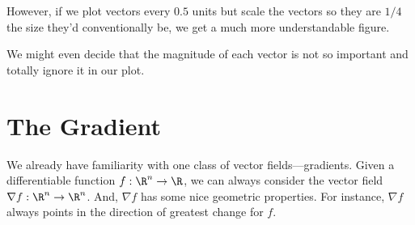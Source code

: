 However, if we plot vectors every $0.5$ units but scale the vectors so they are
$1/4$ the size they'd conventionally be, we get a much more understandable figure.

We might even decide that the magnitude of each vector is not so important
and totally ignore it in our plot.

\begin{center}
\end{center}



\begin{exercises}
\end{exercises}

\section{The Gradient}

We already have familiarity with one class of vector fields---gradients.
Given a differentiable function $f:\R^n\to\R$, we can always consider the
vector field $\nabla f:\R^n\to\R^n$.  And, $\nabla f$ has some nice geometric
properties.  For instance, $\nabla f$ always points in the direction
of greatest change for $f$.

